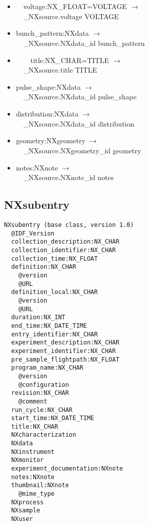 \documentclass[11pt]{article}
\begin{document}
{{\begin{itemize}
\item{\verb|  |voltage:NX\_FLOAT=VOLTAGE $\rightarrow$\\
\verb|  |\_NXsource.voltage VOLTAGE}

\item{bunch\_pattern:NXdata $\rightarrow$\\
\verb|  |\_NXsource.NXdata\_id bunch\_pattern}

\item{\verb|    |title:NX\_CHAR=TITLE $\rightarrow$\\
\verb|  |\_NXsource.title TITLE}

\item{pulse\_shape:NXdata $\rightarrow$\\
\verb|  |\_NXsource.NXdata\_id pulse\_shape}

\item{distribution:NXdata $\rightarrow$\\
\verb|  |\_NXsource.NXdata\_id distribution}

\item{geometry:NXgeometry $\rightarrow$\\
\verb|  |\_NXsource.NXgeometry\_id geometry}

\item{notes:NXnote $\rightarrow$\\
\verb|  |\_NXsource.NXnote\_id notes}
\end{itemize}
\subsection{NXsubentry}

\begin{verbatim}
NXsubentry (base class, version 1.0)
  @IDF_Version
  collection_description:NX_CHAR
  collection_identifier:NX_CHAR
  collection_time:NX_FLOAT
  definition:NX_CHAR
    @version
    @URL
  definition_local:NX_CHAR
    @version
    @URL
  duration:NX_INT
  end_time:NX_DATE_TIME
  entry_identifier:NX_CHAR
  experiment_description:NX_CHAR
  experiment_identifier:NX_CHAR
  pre_sample_flightpath:NX_FLOAT
  program_name:NX_CHAR
    @version
    @configuration
  revision:NX_CHAR
    @comment
  run_cycle:NX_CHAR
  start_time:NX_DATE_TIME
  title:NX_CHAR
  NXcharacterization
  NXdata
  NXinstrument
  NXmonitor
  experiment_documentation:NXnote
  notes:NXnote
  thumbnail:NXnote
    @mime_type
  NXprocess
  NXsample
  NXuser
\end{verbatim}

\begin{itemize}


\end{itemize}}}
\end{document}
